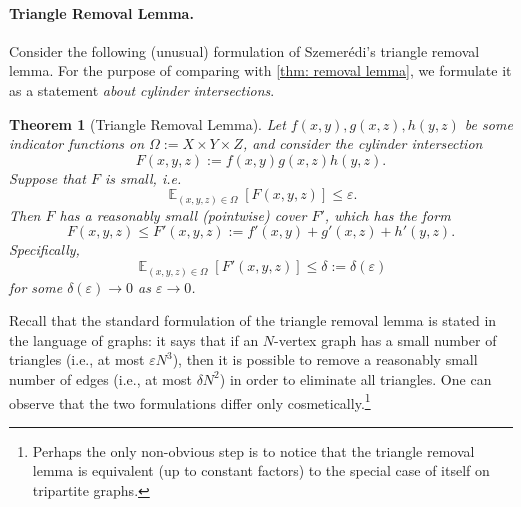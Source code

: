 \documentclass[11pt]{article}
\newtheorem{theorem}{Theorem}[section]
\DeclareMathOperator*{\E}{\mathbb{E}}
\newcommand{\1}{ \mathbbm{1}}
\newcommand{\eps}{\varepsilon}
\begin{document}
\paragraph{Triangle Removal Lemma.}
Consider the following (unusual) formulation of Szemerédi's triangle removal lemma. For the purpose of comparing with \cref{thm: removal lemma}, we formulate it as a statement \textit{about cylinder intersections}. 

\begin{theorem}[Triangle Removal Lemma] \label{thm: triangle removal lemma}
Let $f(x,y),g(x,z),h(y,z)$ be some indicator functions on $\Omega := X \times Y \times Z$, and consider the cylinder intersection
$$ F(x,y,z) := f(x,y) g(x,z) h(y,z). $$
Suppose that $F$ is small, i.e.\
$$ \E_{(x,y,z) \in \Omega}[F(x,y,z)]  \leq \eps. $$
Then $F$ has a reasonably small (pointwise) cover $F'$, which has the form
$$ F(x,y,z) \leq F'(x,y,z) := f'(x,y) + g'(x,z) + h'(y,z). $$
Specifically,
$$ \E_{(x,y,z) \in \Omega}[F'(x,y,z)]  \leq \delta := \delta(\eps) $$
for some $\delta(\eps)  \rightarrow 0$ as $\eps \rightarrow 0$.
\end{theorem}

Recall that the standard formulation of the triangle removal lemma is stated in the language of graphs: it says that if an $N$-vertex graph has a small number of triangles (i.e., at most $\eps N^3$), then it is possible to remove a reasonably small number of edges (i.e., at most $\delta N^2$) in order to eliminate all triangles. One can observe that the two formulations differ only cosmetically.\footnote{Perhaps the only non-obvious step is to notice that the triangle removal lemma is equivalent (up to constant factors) to the special case of itself on tripartite graphs.}
\end{document}

